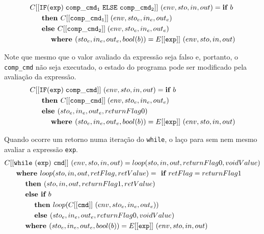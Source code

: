 \documentclass[12pt]{article}
\newcommand\eb[1]{[[\texttt{#1}]]}
\begin{document}
\begin{align*}
&C[[{\tt IF(exp)\; comp\_cmd_1 \ ELSE\ comp\_cmd_2 }]]\ (env,sto,in,out) = \textbf{if } b \\
&\hspace{3ex}\textbf{ then } C[[{\tt comp\_cmd_1}]]\; (env,sto_e,in_e,out_e) \\
&\hspace{3ex}\textbf{ else } C[[{\tt comp\_cmd_2}]]\; (env,sto_e,in_e,out_e) \\
&\hspace{6ex}\textbf{ where }(sto_e,in_e,out_e,bool(b)) = E\eb{exp}\ (env,sto,in,out) \\
\end{align*}

Note que mesmo que o valor avaliado da expressão seja falso e, portanto, o {\tt comp\_cmd} não seja executado, o estado do programa pode ser modificado pela avaliação da expressão.
\begin{align*}
&C[[{\tt IF(exp)\; comp\_cmd}]]\ (env,sto,in,out) = \textbf{if } b \\
&\hspace{3ex}\textbf{ then } C[[{\tt comp\_cmd}]]\; (env,sto_e,in_e,out_e) \\
&\hspace{3ex}\textbf{ else } (sto_e,in_e,out_e,returnFlag0) \\
&\hspace{6ex}\textbf{ where }(sto_e,in_e,out_e,bool(b)) = E\eb{exp}\ (env,sto,in,out) \\
\end{align*}

Quando ocorre um retorno numa iteração do {\tt while}, o laço para sem nem mesmo avaliar a expressão {\tt exp}.
\begin{align*}
&C[[{\tt while\ (exp)\ cmd}]]\ (env,sto,in,out) = loop(sto,in,out,returnFlag0,voidValue) \\
&\hspace{3ex}\textbf{ where } loop(sto,in,out,retFlag,retValue) = \textbf{ if } retFlag = returnFlag1 \\
&\hspace{6ex}\textbf{ then } (sto,in,out,returnFlag1,retValue) \\
&\hspace{6ex}\textbf{ else if } b \\
&\hspace{9ex}\textbf{ then } loop(C\eb{cmd}\ (env,sto_e,in_e,out_e)) \\
&\hspace{9ex}\textbf{ else } (sto_e,in_e,out_e,returnFlag0,voidValue) \\
&\hspace{6ex}\textbf{ where } (sto_e,in_e,out_e,bool(b)) = E\eb{exp}\ (env,sto,in,out) \\
\end{align*}
\end{document}
